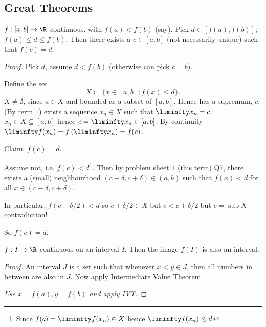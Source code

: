 \documentclass[10pt, a4paper]{article}
\begin{document}
\subsection{Great Theorems}
\begin{theorem}
    $f : [a, b] \to \R$ continuous.
    with $f(a) < f(b)$
    (say).
    Pick $d \in [f(a), f(b)]$;
    $f(a) \leq d \leq f(b)$.
    Then there exists a $c \in [a, b]$
    (not necessarily unique)
    such that $f(c) = d$.
    \begin{proof}
        Pick $d$,
        assume $d < f(b)$
        (otherwise can pick $c = b$).
        
        Define the set
        \[
        X \coloneqq \{x \in [a, b]; f(x) \leq d\}.
        \]
        $X \neq \emptyset$,
        since $a \in X$ and bounded as a subset of $[a, b]$.
        Hence has a supremum,
        $c$.
        (By term $1$)
        exists a sequence $x_n \in X$ such that $\liminfty x_n = c$.
        $x_n \in X \subseteq [a, b]$ hence $c = \liminfty x_n \in [a, b]$.
        By continuity $\liminfty f(x_n) = f\left(\liminfty x_n\right) = f(c)$.

        Claim:
        $f(c) = d$.

        Assume not,
        i.e. $f(c) < d$\footnote{Since $f(c) = \liminfty f(x_n) \in X$ hence $\liminfty f(x_n) \leq d$}.
        Then by problem sheet $1$
        (this term)
        Q7,
        there exists a
        (small)
        neighbourhood $(c - \delta, c + \delta) \in (a, b)$ such that $f(x) < d$ for all $x \in (c - \delta, c + \delta)$.

        In particular, $f(c + \delta / 2) < d$ so $c + \delta / 2 \in X$
        but $c < c + \delta / 2$ but $c = \sup{X}$ contradiction!

        So $f(c) =  d$.
    \end{proof}
\end{theorem}

\begin{corollary}
    $f : I \to \R$ continuous on an interval $I$.
    Then the image $f(I)$ is also an interval.
    
    \begin{proof}
        An interval $J$ is a set such that whenever $x < y \in J$,
        then all numbers in between are also in $J$.
        Now apply Intermediate Value Theorem.

        \textit{Use $x = f(a), y = f(b)$ and apply IVT.}
    \end{proof}
\end{corollary}
\end{document}

